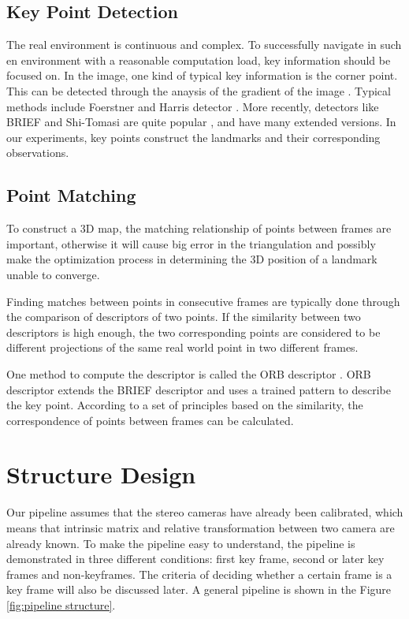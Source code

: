 \documentclass{easychair}
\begin{document}
\subsection{Key Point Detection}
The real environment is continuous and complex. To successfully navigate in such en environment with a reasonable computation load, key information should be focused on. In the image, one kind of typical key information is the corner point. This can be detected through the anaysis of the gradient of the image \cite{gradient}. Typical methods include Foerstner and Harris detector \cite{detector}. More recently, detectors like BRIEF and Shi-Tomasi are quite popular \cite{brief} \cite{shitomasi}, and have many extended versions. In our experiments, key points construct the landmarks and their corresponding observations.

\subsection{Point Matching}
To construct a 3D map, the matching relationship of points between frames are important, otherwise it will cause big error in the triangulation and possibly make the optimization process in determining the 3D position of a landmark unable to converge.

Finding matches between points in consecutive frames are typically done through the comparison of descriptors of two points. If the similarity between two descriptors is high enough, the two corresponding points are considered to be different projections of the same real world point in two different frames. 

One method to compute the descriptor is called the ORB descriptor \cite{orb}. ORB descriptor extends the BRIEF descriptor \cite{brief} and uses a trained pattern to describe the key point. According to a set of principles based on the similarity, the correspondence of points between frames can be calculated.

\section{Structure Design}


Our pipeline assumes that the stereo cameras have already been calibrated, which means that intrinsic matrix and relative transformation between two camera are already known. To make the pipeline easy to understand, the pipeline is demonstrated in three different conditions: first key frame, second or later key frames and non-keyframes. The criteria of deciding whether a certain frame is a key frame will also be discussed later. A general pipeline is shown in the Figure \ref{fig:pipeline structure}.
\end{document}
